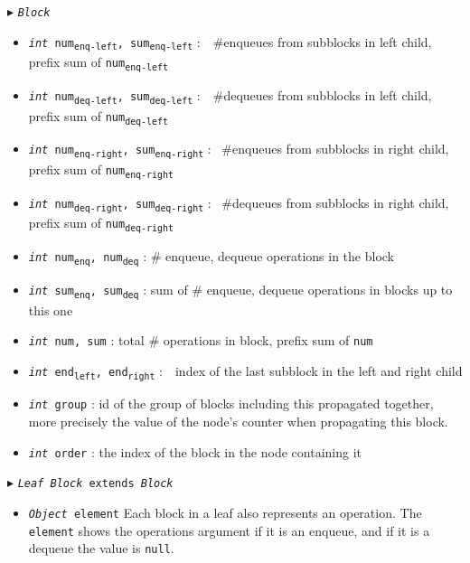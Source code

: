 \documentclass[10pt]{article}
\theoremstyle{definition}
\begin{document}
\begin{algorithm}
\begin{algorithmic}[1]
\begin{multicols}{2}
\begin{itemize}
\end{itemize}


\Statex $\blacktriangleright$ \texttt{\textsl{Block}}

\begin{itemize}
  \item \texttt{\textsl{int} num\textsubscript{enq-left}, sum\textsubscript{enq-left}}
  \textsf{:~~\#enqueues from subblocks in left child, prefix sum of \texttt{num\textsubscript{enq-left}}}
  \item \texttt{\textsl{int} num\textsubscript{deq-left}, sum\textsubscript{deq-left}}
  \textsf{:~~\#dequeues from subblocks in left child, prefix sum of \texttt{num\textsubscript{deq-left}}}
  \item \texttt{\textsl{int} num\textsubscript{enq-right}, \texttt{sum\textsubscript{enq-right}}}
  \textsf{: ~\#enqueues from subblocks in right child, prefix sum of \texttt{num\textsubscript{enq-right}}}
  \item \texttt{\textsl{int} num\textsubscript{deq-right}, \texttt{sum\textsubscript{deq-right}}}
  \textsf{: ~\#dequeues from subblocks in right child, prefix sum of \texttt{num\textsubscript{deq-right}}}
  \item \texttt{\textsl{int} num\textsubscript{enq}, num\textsubscript{deq}}
  \textsf{: \# enqueue, dequeue operations in the block}
  \item \texttt{\textsl{int} sum\textsubscript{enq}, sum\textsubscript{deq}}
  \textsf{: sum of \# enqueue, dequeue operations in blocks up to this one}
  \item \texttt{\textsl{int} num, sum}
  \textsf{: total \# operations in block, prefix sum of \texttt{num}}
  \item \texttt{\textsl{int} end\textsubscript{left}, end\textsubscript{right}}
  \textsf{:~~index of the last subblock in the left and right child}
  \item \texttt{\textsl{int} group}
  \textsf{: id of the group of blocks including this propagated together, more precisely the value of the node's counter when propagating this block.}
  \item \texttt{\textsl{int} order}
  \textsf{: the index of the block in the node containing it}
\end{itemize}

\pagebreak

\Statex $\blacktriangleright$ \texttt{\textsl{Leaf Block} extends \textsl{Block}}
\begin{itemize}
  \item \texttt{\textsl{Object} element}
  \textsf{Each block in a leaf also represents an operation. The \texttt{element} shows the operations argument if it is an enqueue, and if it is a dequeue the value is \texttt{null}.}
\end{itemize}


\end{multicols}
\end{algorithmic}
\end{algorithm}
\end{document}
